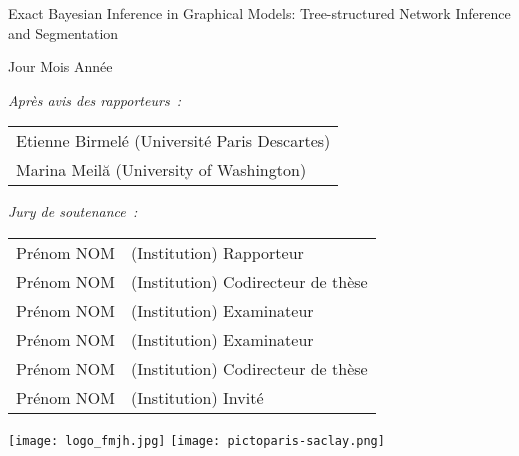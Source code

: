 \documentclass[a4paper,12pt]{article}
\begin{document}
\shorthandoff{:} 
\begin{center}
{\Large Exact Bayesian Inference in Graphical {Models:} Tree-structured Network Inference and Segmentation}
\end{center}
\shorthandon{:}


\vspace{10mm}

 Jour Mois Ann\'ee

\vspace{5mm}

\noindent
{\small \it Apr\`es avis des rapporteurs~: }
\begin{tabular}{l} {\sc  Etienne Birmel\'e} (Universit\'e Paris Descartes)\\
{\sc Marina Meil\u{a}} (University of Washington)\vspace{1mm}  \\
\end{tabular}

\vspace{8mm}

\noindent
{\small \it Jury de soutenance~: }
\begin{tabular}{ll}
{\sc   Pr\'enom NOM}&(Institution) {\small Rapporteur}\vspace{1mm}\\
{\sc   Pr\'enom NOM}&(Institution) {\small Codirecteur de th\`ese}\vspace{1mm}\\
{\sc   Pr\'enom NOM}&(Institution) {\small Examinateur}\vspace{1mm}\\
{\sc   Pr\'enom NOM}&(Institution) {\small Examinateur}\vspace{1mm}\\
{\sc   Pr\'enom NOM}&(Institution) {\small Codirecteur de th\`ese}\vspace{1mm}\\
{\sc   Pr\'enom NOM}&(Institution) {\small Invit\'e}\vspace{1mm}\\
\end{tabular}


\vfill
\noindent
\hbox{\texttt{[image: logo\_fmjh.jpg]}}
\hfill \texttt{[image: pictoparis-saclay.png]}
\end{document}
